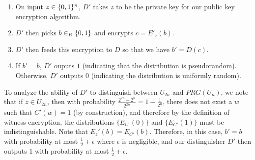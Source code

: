 \documentclass{article}
\begin{document}
\begin{enumerate}
\begin{enumerate}[noitemsep,topsep=\mdcompacttopsep,label=\alph*.]
\begin{mdbmarginx}{1ex}{0pt}{1ex}{0pt}
\begin{enumerate}[noitemsep,topsep=\mdcompacttopsep]%

\item{}On input $z \in \{0,1\}^n$, $D'$ takes $z$ to be the private key for our public key encryption 
algorithm.%

\item{}$D'$ then picks $b \in_R \{0,1\}$ and encrypts $c = E'_z(b)$.%

\item{}$D'$ then feeds this encryption to $D$ so that we have $b' = D(c)$.%

\item{}If $b' = b$, $D'$ ouputs $1$ (indicating that the distribution is pseudorandom). Otherwise, $D'$
outputs $0$ (indicating the distribution is uniformly random).%
\end{enumerate}%

\noindent{}To analyze the ability of $D'$ to distinguish between $U_{2n}$ and $PRG(U_n)$, we note that if
$z \in U_{2n}$, then with probability $\frac{2^{2n} - 2^n}{2^{2n}} = 1 - \frac{1}{2^{n}}$, there does 
not exist a $w$ such that $C'(w) = 1$ (by construction),
and therefore by the definition of witness encryption, the distributions $\{E_{C'}(0)\}$ and $\{E_{C'}(1)\}$
must be indistinguishable. Note that $E_z'(b) = E_{C'}(b)$. Therefore, in this case, $b' = b$ with
probability at most $\frac{1}{2} + \epsilon$ where $\epsilon$ is negligible, and our distinguisher
$D'$ then outputs 1 with probability at most $\frac{1}{2} + \epsilon$.%


\end{mdbmarginx}
\end{enumerate}
\end{enumerate}
\end{document}
